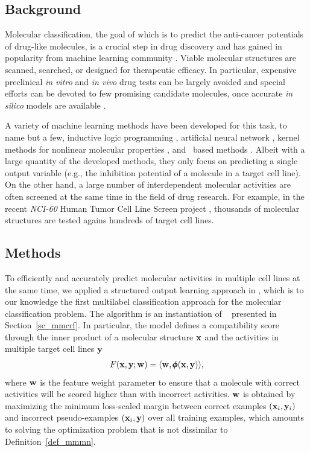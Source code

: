 {%
%
\subsection{Background}

Molecular classification, the goal of which is to predict the anti-cancer potentials of drug-like molecules, is a crucial step in drug discovery and has gained in popularity from machine learning community \citep{Singh12qsar,Dutt12classification}.
Viable molecular structures are scanned, searched, or designed for therapeutic efficacy.
In particular, expensive preclinical \textit{in vitro} and \textit{in vivo} drug tests can be largely avoided and special efforts can be devoted to few promising candidate molecules, once accurate \textit{in silico} models are available \citep{Burbidg01drug}.

A variety of machine learning methods have been developed for this task, to name but a few, inductive logic programming \citep{King96structure}, artificial neural network \citep{Bernazzani06predicting}, kernel methods for nonlinear molecular properties \citep{Trotter01drug,Ralaivola05graph,Swamidass05kernel,Ceroni07classification}, and \svm\ based methods \citep{Trotter01drug,Byvatov03comparison,Xue04effect}.
Albeit with a large quantity of the developed methods, they only focus on predicting a single output variable (e.g., the inhibition potential of a molecule in a target cell line). 
On the other hand, a large number of interdependent molecular activities are often screened at the same time in the field of drug research.
For example, in the recent \textit{NCI-60} {Human Tumor Cell Line Screen} project \citep{Shoemaker06the}, thousands of molecular structures are tested agains hundreds of target cell lines.



%
%
\subsection{Methods}

To efficiently and accurately predict molecular activities in multiple cell lines at the same time, we applied a structured output learning approach in , which is to our knowledge the first multilabel classification approach for the molecular classification problem.
The algorithm is an instantiation of \mmcrf\ \citep{Rousu07} presented in Section~\ref{sc_mmcrf}.
In particular, the model defines a compatibility score through the inner product of a molecular structure $\mathbf {x}$ and the activities in multiple target cell lines $\mathbf {y}$
\begin{align*}
	F(\mathbf {x},\mathbf {y};\mathbf {w}) = \langle \mathbf {w}, \pmb \phi(\mathbf {x},\mathbf {y}) \rangle,
\end{align*}
where $\mathbf {w}$ is the feature weight parameter to ensure that a molecule with correct activities will be scored higher than with incorrect activities.
$\mathbf {w}$ is obtained by maximizing the minimum loss-scaled margin between correct examples $(\mathbf {x}_i,\mathbf {y}_i)$ and incorrect pseudo-examples $(\mathbf {x}_i,\mathbf {y})$ over all training examples, which amounts to solving the optimization problem that is not dissimilar to Definition~\ref{def_mmmn}.

}
